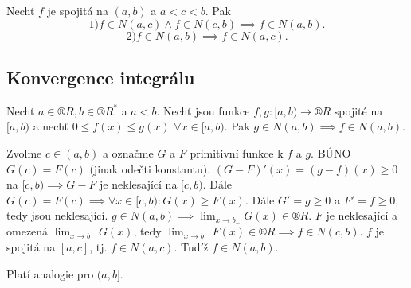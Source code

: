 \documentclass[12pt]{article}                   %
\begin{document}
        \begin{pozorovani}
            Nechť $f$ je spojitá na $(a, b)$ a $a < c < b$. Pak
            $$ 1) f \in N(a, c) \land f \in N(c, b) \implies f \in N(a, b). $$ 
            $$ 2) f \in N(a, b) \implies f \in N(a, c). $$ 
        \end{pozorovani}


    \subsection{Konvergence integrálu}
        \begin{veta}
            Nechť $a \in ®R, b \in ®R^*$ a $a < b$. Nechť jsou funkce $f, g: [a, b) \rightarrow ®R$ spojité na $[a, b)$ a nechť $0 ≤ f(x) ≤ g(x)$ $\forall x \in [a, b)$. Pak $g \in N(a, b) \implies f \in N(a, b)$.

            \begin{dukazin}
                    Zvolme $c \in (a, b)$ a označme $G$ a $F$ primitivní funkce k $f$ a $g$. BÚNO $G(c) = F(c)$ (jinak odečti konstantu). $(G-F)'(x) = (g - f)(x) ≥ 0$ na $[c, b) \implies G-F$ je neklesající na $[c, b)$. Dále $G(c) = F(c) \implies \forall x \in [c, b): G(x) ≥ F(x)$. Dále $G'=g≥0$ a $F'=f≥0$, tedy jsou neklesající. $g \in N(a, b) \implies \lim_{x \rightarrow b_-} G(x) \in ®R$. $F$ je neklesající a omezená $\lim_{x \rightarrow b_-} G(x)$, tedy $\lim_{x \rightarrow b_-} F(x) \in ®R \implies f\in N(c, b)$. $f$ je spojitá na $[a,c]$, tj. $f \in N(a, c)$. Tudíž $f \in N(a, b)$.
            \end{dukazin}
        \end{veta}

        \begin{poznamka}
            Platí analogie pro $(a, b]$.
        \end{poznamka}
\end{document}
